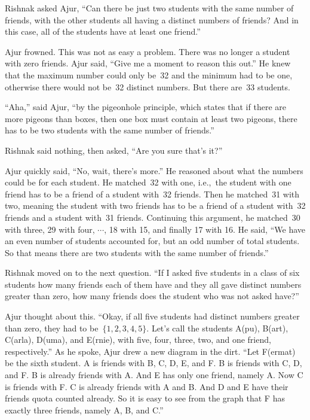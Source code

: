 Rishnak asked Ajur, ``Can there be just two students with the same number of friends, with the other students all having a distinct numbers of friends? And in this case, all of the students have at least one friend.''

Ajur frowned. This was not as easy a problem. There was no longer a student with zero friends. Ajur said, ``Give me a moment to reason this out.'' He knew that the maximum number could only be~32 and the minimum had to be one, otherwise there would not be~32 distinct numbers. But there are~33 students.

``Aha,'' said Ajur, ``by the pigeonhole principle, which states that if there are more pigeons than boxes, then one box must contain at least two pigeons, there has to be two students with the same number of friends.''

Rishnak said nothing, then asked, ``Are you sure that's it?''

Ajur quickly said, ``No, wait, there's more.''  He reasoned about what the numbers could be for each student. He matched~32 with one, i.e.,~the student with one friend has to be a friend of a student with~32 friends. Then he matched~31 with two, meaning the student with two friends has to be a friend of a student with~32 friends and a student with~31 friends. Continuing this argument, he matched~30 with three, 29 with four, $\cdots$, 18 with 15, and finally 17 with 16. He said, ``We have an even number of students accounted for, but an odd number of total students. So that means there are two students with the same number of friends.''

Rishnak moved on to the next question. ``If I asked five students in a class of six students how many friends each of them have and they all gave distinct numbers greater than zero, how many friends does the student who was not asked have?''

Ajur thought about this. ``Okay, if all five students had distinct numbers greater than zero, they had to be~$\{1,2,3,4,5\}$. Let's call the students A(pu), B(art), C(arla), D(uma), and E(rnie), with five, four, three, two, and one friend, respectively.''  As he spoke, Ajur drew a new diagram in the dirt. ``Let F(ermat) be the sixth student. A is friends with B, C, D, E, and F. B is friends with C, D, and F. B is already friends with A. And E has only one friend, namely A. Now C is friends with F. C is already friends with A and B. And D and E have their friends quota counted already. So it is easy to see from the graph that F has exactly three friends, namely A, B, and C.''

